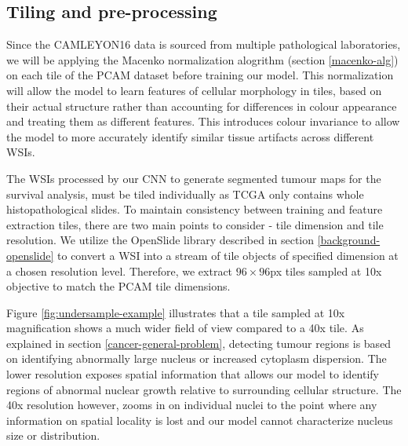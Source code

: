 \documentclass{l4proj}
\begin{document}
\subsection{Tiling and pre-processing}
Since the CAMLEYON16 data is sourced from multiple pathological laboratories, we will be applying the Macenko normalization alogrithm (section \ref{macenko-alg}) on each tile of the PCAM dataset before training our model. This normalization will allow the model to learn features of cellular morphology in tiles, based on their actual structure rather than accounting for differences in colour appearance and treating them as different features. This introduces colour invariance to allow the model to more accurately identify similar tissue artifacts across different WSIs. 

The WSIs processed by our CNN to generate segmented tumour maps for the survival analysis, must be tiled individually as TCGA only contains whole histopathological slides. To maintain consistency between training and feature extraction tiles, there are two main points to consider - tile dimension and tile resolution. We utilize the OpenSlide library described in section \ref{background-openslide} to convert a WSI into a stream of tile objects of specified dimension at a chosen resolution level. Therefore, we extract \(96 \times 96\)px tiles sampled at 10x objective to match the PCAM tile dimensions.

Figure \ref{fig:undersample-example} illustrates that a tile sampled at 10x magnification shows a much wider field of view compared to a 40x tile. As explained in section \ref{cancer-general-problem}, detecting tumour regions is based on identifying abnormally large nucleus or increased cytoplasm dispersion. The lower resolution exposes spatial information that allows our model to identify regions of abnormal nuclear growth relative to surrounding cellular structure. The 40x resolution however, zooms in on individual nuclei to the point where any information on spatial locality is lost and our model cannot characterize nucleus size or distribution. 
\end{document}
